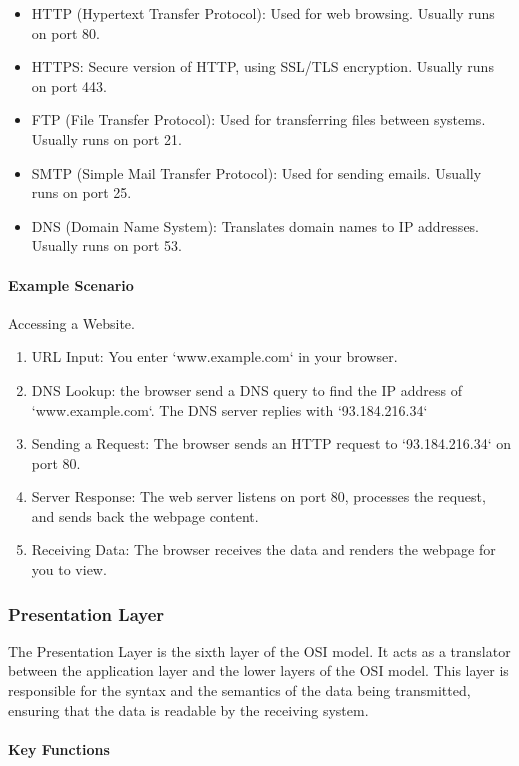 \documentclass[a4paper]{article}
\begin{document}
    \begin{itemize}
        \item HTTP (Hypertext Transfer Protocol): Used for web browsing. Usually runs on port 80.
        \item HTTPS: Secure version of HTTP, using SSL/TLS encryption. Usually runs on port 443.
        \item FTP (File Transfer Protocol): Used for transferring files between systems. Usually runs on port 21.
        \item SMTP (Simple Mail Transfer Protocol): Used for sending emails. Usually runs on port 25.
        \item DNS (Domain Name System): Translates domain names to IP addresses. Usually runs on port 53.
    \end{itemize}

    \paragraph*{Example Scenario} Accessing a Website.
    
    \begin{enumerate}
        \item URL Input: You enter `www.example.com` in your browser.
        \item DNS Lookup: the browser send a DNS query to find the IP address of `www.example.com`. The DNS server replies with `93.184.216.34`
        \item Sending a Request: The browser sends an HTTP request to `93.184.216.34` on port 80.
        \item Server Response: The web server listens on port 80, processes the request, and sends back the webpage content.
        \item Receiving Data: The browser receives the data and renders the webpage for you to view.
    \end{enumerate}

    \subsubsection{Presentation Layer} The Presentation Layer is the sixth layer of the OSI model. It acts as a translator between the application layer and the lower layers of the OSI model. This layer is responsible for the syntax and the semantics of the data being transmitted, ensuring that the data is readable by the receiving system.

    \paragraph{Key Functions}
\end{document}
